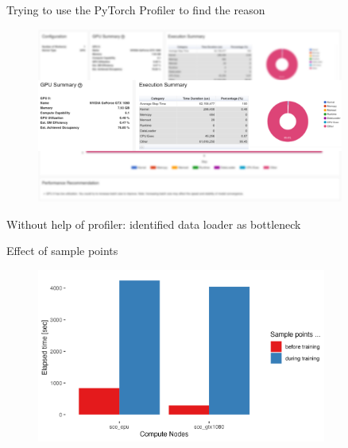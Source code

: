 \documentclass[compress,aspectratio=169]{beamer}
\begin{document}
\begin{frame}{Trying to use the PyTorch Profiler to find the reason}
    \vspace{-1em}
    \begin{center}
    \begin{figure}
        \includegraphics[width=0.9\textwidth]{../../data/scap_gtx1080_profiler-torch_sample-points_14628864_zoom}
    \end{figure}
    \end{center}
\end{frame}

\begin{frame}{Without help of profiler: identified data loader as bottleneck}
    
\end{frame}

\begin{frame}{Effect of sample points}
    \vspace{-1em}
    \begin{center}
    \begin{figure}
        \includegraphics[width=0.85\textwidth]{../../data/sacct_barplot_by_nodes_sample-points-effect}
    \end{figure}
    \end{center}
\end{frame}
\end{document}
